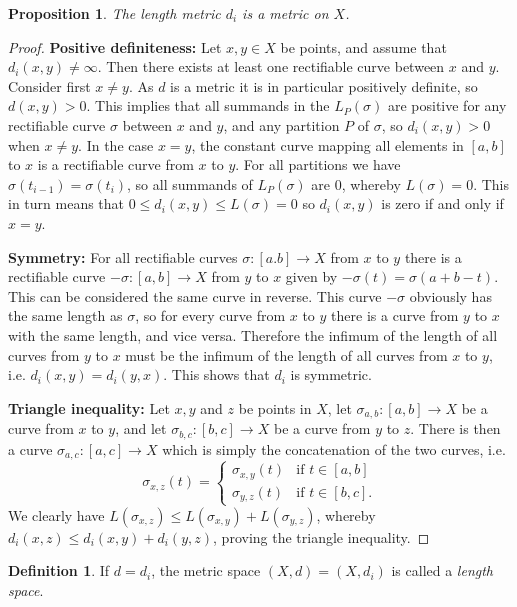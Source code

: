 \documentclass[11pt, a4paper, oneside]{memoir}
\theoremstyle{plain}\newtheorem{theorem}[subsection]{Theorem}
\newtheorem{proposition}[subsection]{Proposition}
\theoremstyle{definition}
\newtheorem{definition}[subsection]{Definition}
\begin{document}
\begin{proposition}
The length metric \(d_i\) is a metric on \(X\).
\end{proposition}
\begin{proof}
\textbf{Positive definiteness:} 
Let \(x,y\in X\) be points, and assume that \(d_i(x,y)\neq\infty\).
Then there exists at least one rectifiable curve between \(x\) and \(y\).
Consider first \(x\neq y\).
As \(d\) is a metric it is in particular positively definite, so \(d(x,y)>0\). 
This implies that all summands in the \(L_P(\sigma)\) are positive for any rectifiable curve \(\sigma\) between \(x\) and \(y\), and any partition \(P\) of \(\sigma\), so \(d_i(x,y)>0\) when \(x\neq y\).
In the case \(x=y\), the constant curve mapping all elements in \([a,b]\) to \(x\) is a rectifiable curve from \(x\) to \(y\).
For all partitions we have \(\sigma(t_{i-1})=\sigma(t_i)\), so all summands of \(L_P(\sigma)\) are 0, whereby \(L(\sigma)=0\).
This in turn means that \(0\leq d_i(x,y)\leq L(\sigma)= 0\) so \(d_i(x,y)\) is zero if and only if \(x=y\).

\textbf{Symmetry:}
For all rectifiable curves \(\sigma:[a.b]\to X\) from \(x\) to \(y\) there is a rectifiable curve \(-\sigma:[a,b]\to X\) from \(y\) to \(x\) given by \(-\sigma(t)=\sigma(a+b-t)\).
This can be considered the same curve in reverse.
This curve \(-\sigma\) obviously has the same length as \(\sigma\), so for every curve from \(x\) to \(y\) there is a curve from \(y\) to \(x\) with the same length, and vice versa.
Therefore the infimum of the length of all curves from \(y\) to \(x\) must be the infimum of the length of all curves from \(x\) to \(y\), i.e. \(d_i(x,y)=d_i(y,x)\).
This shows that \(d_i\) is symmetric.

\textbf{Triangle inequality:}
Let \(x,y\) and \(z\) be points in \(X\), let \(\sigma_{a,b}:[a,b]\to X\) be a curve from \(x\) to \(y\), and let \(\sigma_{b,c}:[b,c]\to X\) be a curve from \(y\) to \(z\).
There is then a curve \(\sigma_{a,c}:[a,c]\to X\) which is simply the concatenation of the two curves, i.e.
\[\sigma_{x,z}(t)=\begin{cases}
\sigma_{x,y}(t)     &\text{if }t\in [a,b]\\
\sigma_{y,z}(t)     &\text{if }t\in [b,c].
\end{cases}\]
We clearly have \(L(\sigma_{x,z})\leq L(\sigma_{x,y})+L(\sigma_{y,z})\), whereby \(d_i(x,z)\leq d_i(x,y)+d_i(y,z)\), proving the triangle inequality.
\end{proof}

\begin{definition}\label{def::length metric}
    If \(d=d_i\), the metric space \((X,d)=(X,d_i)\) is called a \textit{length space}. 
\end{definition}
\end{document}
